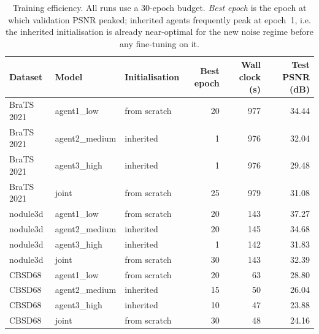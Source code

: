 \begin{table}[!t]
\centering
\caption{Training efficiency. All runs use a 30-epoch budget. \emph{Best epoch} is the epoch at which validation PSNR peaked; inherited agents frequently peak at epoch~1, i.e. the inherited initialisation is already near-optimal for the new noise regime before any fine-tuning on it.}
\label{tab:efficiency}
\begin{tabular}{lllrrr}
\toprule
Dataset & Model & Initialisation & Best epoch & Wall clock (s) & Test PSNR (dB) \\
\midrule
BraTS 2021 & agent1\_low & from scratch & 20 & 977 & 34.44 \\
BraTS 2021 & agent2\_medium & inherited & 1 & 976 & 32.04 \\
BraTS 2021 & agent3\_high & inherited & 1 & 976 & 29.48 \\
BraTS 2021 & joint & from scratch & 25 & 979 & 31.08 \\
nodule3d & agent1\_low & from scratch & 20 & 143 & 37.27 \\
nodule3d & agent2\_medium & inherited & 20 & 145 & 34.68 \\
nodule3d & agent3\_high & inherited & 1 & 142 & 31.83 \\
nodule3d & joint & from scratch & 30 & 143 & 32.39 \\
CBSD68 & agent1\_low & from scratch & 20 & 63 & 28.80 \\
CBSD68 & agent2\_medium & inherited & 15 & 50 & 26.04 \\
CBSD68 & agent3\_high & inherited & 10 & 47 & 23.88 \\
CBSD68 & joint & from scratch & 30 & 48 & 24.16 \\
\bottomrule
\end{tabular}
\end{table}

